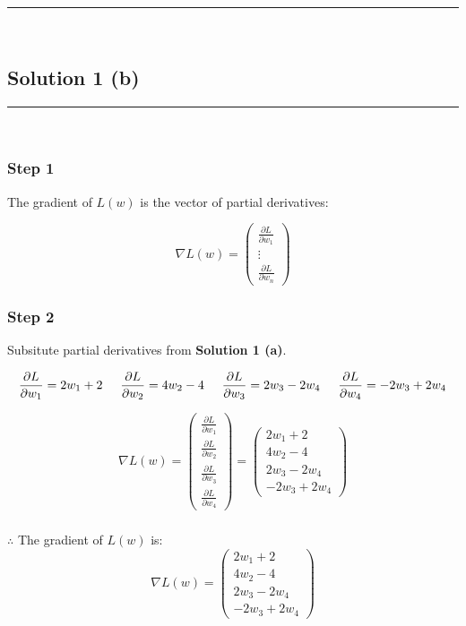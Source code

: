 \documentclass{article}
\begin{document}
\noindent\rule{\textwidth}{0.4pt}\\

\newpage

\subsection*{Solution 1 (b)}
\noindent\rule{\textwidth}{0.4pt}\\

\subsubsection*{Step 1}
\parbox{\textwidth}{
The gradient of $L(w)$ is the vector of partial derivatives:
}
$$
\nabla L(w) = \begin{pmatrix} \frac{\partial L}{\partial w_1} \\ \vdots \\ \frac{\partial L}{\partial w_n} \end{pmatrix}
$$

\subsubsection*{Step 2}
\parbox{\textwidth}{
Subsitute partial derivatives from \textbf{Solution 1 (a)}.
}
$$
\frac{\partial L}{\partial w_1} = 2w_1 + 2 \hspace{0.5cm} \frac{\partial L}{\partial w_2} = 4w_2 - 4  \hspace{0.5cm} \frac{\partial L}{\partial w_3} = 2w_3 - 2w_4 \hspace{0.5cm} \frac{\partial L}{\partial w_4} = -2w_3 + 2w_4
$$

$$
\nabla L(w) =
\begin{pmatrix}
  \frac{\partial L}{\partial w_1} \\
  \frac{\partial L}{\partial w_2} \\
  \frac{\partial L}{\partial w_3} \\
  \frac{\partial L}{\partial w_4}
\end{pmatrix} =
\begin{pmatrix}
  2w_1 + 2 \\
  4w_2 - 4 \\
  2w_3 - 2w_4 \\
  -2w_3 + 2w_4
\end{pmatrix}
$$

\subsubsection*{\normalfont}{$\therefore$ The gradient of $L(w)$ is:}
$$
\nabla L(w) =
\begin{pmatrix}
  2w_1 + 2 \\
  4w_2 - 4 \\
  2w_3 - 2w_4 \\
  -2w_3 + 2w_4
\end{pmatrix}
$$
\end{document}
